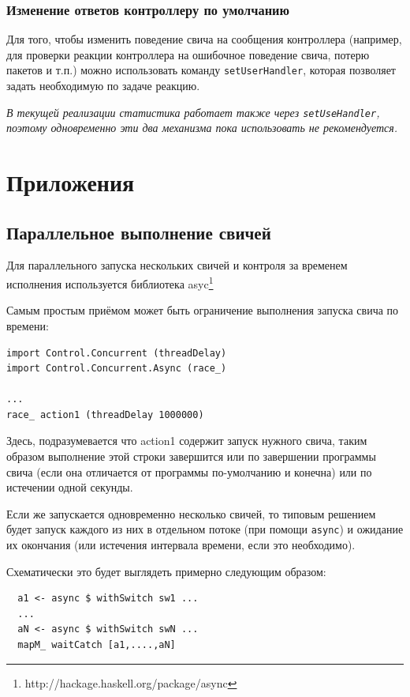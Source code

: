 \documentclass[9pt,a4paper]{article}
\begin{document}
\subsubsection{Изменение ответов контроллеру по умолчанию}

Для того, чтобы изменить поведение свича на сообщения контроллера (например, для
проверки реакции контроллера на ошибочное поведение свича, потерю пакетов и т.п.)
можно использовать команду \lstinline!setUserHandler!, которая позволяет задать
необходимую по задаче реакцию.

\emph{В текущей реализации статистика работает также через \lstinline!setUseHandler!,
поэтому одновременно эти два механизма пока использовать не рекомендуется.}

\section{Приложения}

\subsection{Параллельное выполнение свичей}

Для параллельного запуска нескольких свичей и контроля за временем исполнения
используется библиотека asyc\footnote{http://hackage.haskell.org/package/async}

Самым простым приёмом может быть ограничение выполнения запуска свича по времени:

\begin{lstlisting}
import Control.Concurrent (threadDelay)
import Control.Concurrent.Async (race_)

...
race_ action1 (threadDelay 1000000)
\end{lstlisting}

Здесь, подразумевается что action1 содержит запуск нужного свича, таким образом
выполнение этой строки завершится или по завершении программы свича (если она
отличается от программы по-умолчанию и конечна) или по истечении одной секунды.

Если же запускается одновременно несколько свичей, то типовым решением будет
запуск каждого из них в отдельном потоке (при помощи \lstinline!async!) и ожидание
их окончания (или истечения интервала времени, если это необходимо).

Схематически это будет выглядеть примерно следующим образом:

\begin{lstlisting}
  a1 <- async $ withSwitch sw1 ...
  ...
  aN <- async $ withSwitch swN ...
  mapM_ waitCatch [a1,....,aN]
\end{lstlisting}
\end{document}
